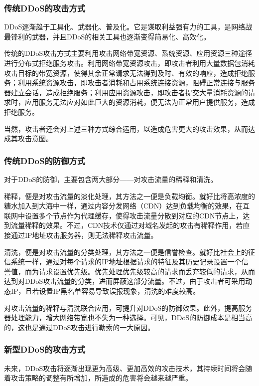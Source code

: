 \documentclass{article}
\begin{document}
\subsubsection{传统DDoS的攻击方式}

DDoS逐渐趋于工具化、武器化、普及化。它是谋取利益强有力的工具，是网络战最锋利的武器，并且DDoS的相关工具也逐渐变得简易化、高效化。

传统的DDoS攻击方式主要利用攻击网络带宽资源、系统资源、应用资源三种途径进行分布式拒绝服务攻击。利用网络带宽资源攻击，即攻击者利用大量数据包消耗攻击目标的带宽资源，使得其余正常请求无法得到及时、有效的响应，造成拒绝服务；利用系统资源攻击，即攻击者消耗和占用系统连接资源，阻碍正常连接与服务器建立会话，造成拒绝服务；利用应用资源攻击，即攻击者提交大量消耗资源的请求时，应用服务无法应对如此巨大的资源消耗，便无法为正常用户提供服务，造成拒绝服务。

当然，攻击者还会对上述三种方式综合运用，以造成危害更大的攻击效果，从而达成其攻击意图。

\subsubsection{传统DDoS的防御方式}

对于DDoS的防御，主要包含两大部分——对攻击流量的稀释和清洗。

稀释，便是对攻击流量的淡化处理，其方法之一便是负载均衡。就好比将高浓度的糖水加入到大海中一样，通过内容分发网络（CDN）达到负载均衡的效果，在互联网中设置多个节点作为代理缓存，使得攻击流量分散到对应的CDN节点上，达到流量稀释的效果。不过，CDN技术仅通过对域名发起的攻击有稀释作用，若直接通过IP地址攻击服务器，则无法稀释攻击流量。

清洗，便是对攻击流量的分类处理，其方法之一便是信誉检查。就好比社会上的征信系统一样，通过对每个请求的IP地址根据请求的特征及其历史记录设置一个信誉值，而为请求设置优先级。优先处理优先级较高的请求而丢弃较低的请求，从而达到对DDoS攻击流量的分类，进而屏蔽这部分流量。不过，由于攻击者可采用动态IP，且若设置IP黑名单容易导致误报现象，清洗的难度较高。

对攻击流量的稀释与清洗联合应用，可提升对DDoS的防御效果。此外，提高服务器处理能力，增大网络带宽也不失为一种选择。可见，DDoS的防御成本是相当高的，这也是通过DDoS攻击进行勒索的一大原因。

\subsubsection{新型DDoS的攻击方式}

未来，DDoS攻击将逐渐出现更为高级、更加高效的攻击技术，其持续时间将会随着攻击策略的调整有所增加，所造成的危害将会越来越严重。
\end{document}
